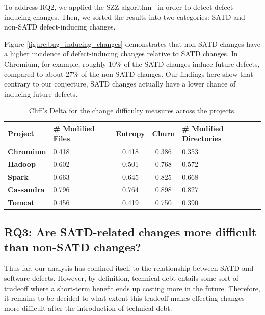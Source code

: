 To address RQ2, we applied the SZZ algorithm~\cite{sliwerski-msr-2005} in order to detect defect-inducing changes. Then, we sorted the results into two categories: SATD and non-SATD defect-inducing changes.




Figure \ref{figure:bug_inducing_changes} demonstrates that non-SATD changes have a higher incidence of defect-inducing changes relative to SATD changes.  In Chromium, for example, roughly 10\% of the SATD changes induce future defects, compared to about 27\% of the non-SATD changes. Our findings here show that contrary to our conjecture, SATD changes actually have a lower chance of inducing future defects.




\begin{table}[tb!]
	\setlength{\tabcolsep}{.7\tabcolsep}
	\centering
	\caption{Cliff's Delta for the change difficulty measures across the projects.}
	\begin{tabular}{l|C{1.5in}|c|c|C{2in}}
		\hline
		\textbf{Project}   & {\bf \# Modified Files}    & {\bf Entropy} & {\bf Churn} & {\bf\# Modified Directories}    \\ \hline
		\textbf{Chromium}  & 0.418 & 0.418   & 0.386 & 0.353 \\ \hline
		\textbf{Hadoop}    & 0.602 & 0.501   & 0.768 & 0.572 \\ \hline
		\textbf{Spark}     & 0.663 & 0.645   & 0.825 & 0.668 \\ \hline
		\textbf{Cassandra} & 0.796 & 0.764   & 0.898 & 0.827 \\ \hline
		\textbf{Tomcat}    & 0.456 & 0.419   & 0.750 & 0.390 \\ \hline
	\end{tabular}
	\label{table:cliff_deltas_RQ3}
\end{table}

\subsection*{RQ3: Are SATD-related changes more difficult than non-SATD changes?}

 Thus far, our analysis has confined itself to the relationship between SATD and software defects. However, by definition, technical debt entails some sort of tradeoff where a short-term benefit ends up costing more in the future. Therefore, it remains to be decided to what extent this tradeoff makes effecting changes more difficult after the introduction of technical debt.

